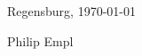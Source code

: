 \documentclass[10pt,A4,english]{article}
\begin{document}
\begin{paracol}{2}
\begin{rightcolumn}
Regensburg, \today     \hspace{1cm}   \hrulefill

\hspace*{30mm}\phantom{Regensburg, \today }Philip Empl

\end{rightcolumn}
\end{paracol}
\end{document}
